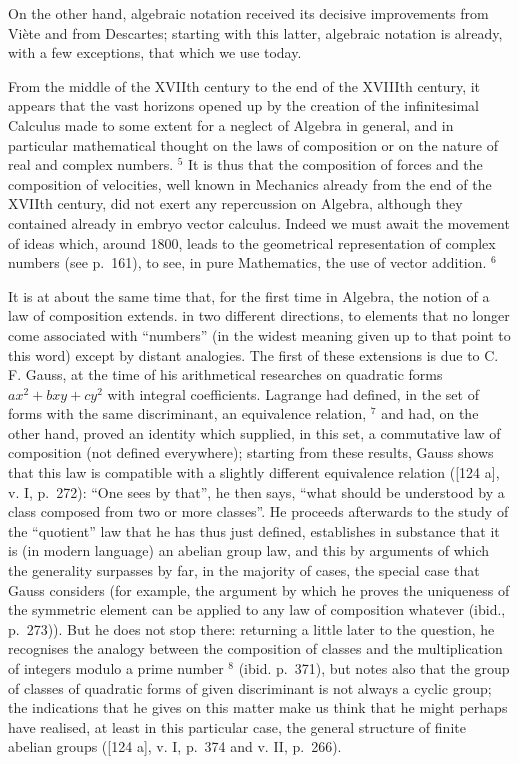 On the other hand, algebraic notation received its decisive improvements from Viète and from Descartes; starting with this latter, algebraic notation is already, with a few exceptions, that which we use today.

From the middle of the XVIIth century to the end of the XVIIIth century, it appears that the vast horizons opened up by the creation of the infinitesimal Calculus made to some extent for a neglect of Algebra in general, and in particular mathematical thought on the laws of composition or on the nature of real and complex numbers. \(^{5}\) It is thus that the composition of forces and the composition of velocities, well known in Mechanics already from the end of the XVIIth century, did not exert any repercussion on Algebra, although they contained already in embryo vector calculus. Indeed we must await the movement of ideas which, around 1800, leads to the geometrical representation of complex numbers (see p.~161), to see, in pure Mathematics, the use of vector addition. \(^{6}\)

It is at about the same time that, for the first time in Algebra, the notion of a law of composition extends. in two different directions, to elements that no longer come associated with ``numbers'' (in the widest meaning given up to that point to this word) except by distant analogies. The first of these extensions is due to C. F. Gauss, at the time of his arithmetical researches on quadratic forms \(ax^{2} + bxy + cy^{2}\) with integral coefficients. Lagrange had defined, in the set of forms with the same discriminant, an equivalence relation, \(^{7}\) and had, on the other hand, proved an identity which supplied, in this set, a commutative law of composition (not defined everywhere); starting from these results, Gauss shows that this law is compatible with a slightly different equivalence relation ({[}124 a{]}, v. I, p.~272): ``One sees by that'', he then says, ``what should be understood by a class composed from two or more classes''. He proceeds afterwards to the study of the ``quotient'' law that he has thus just defined, establishes in substance that it is (in modern language) an abelian group law, and this by arguments of which the generality surpasses by far, in the majority of cases, the special case that Gauss considers (for example, the argument by which he proves the uniqueness of the symmetric element can be applied to any law of composition whatever (ibid., p.~273)). But he does not stop there: returning a little later to the question, he recognises the analogy between the composition of classes and the multiplication of integers modulo a prime number \(^{8}\) (ibid. p.~371), but notes also that the group of classes of quadratic forms of given discriminant is not always a cyclic group; the indications that he gives on this matter make us think that he might perhaps have realised, at least in this particular case, the general structure of finite abelian groups ({[}124 a{]}, v. I, p.~374 and v. II, p.~266).

